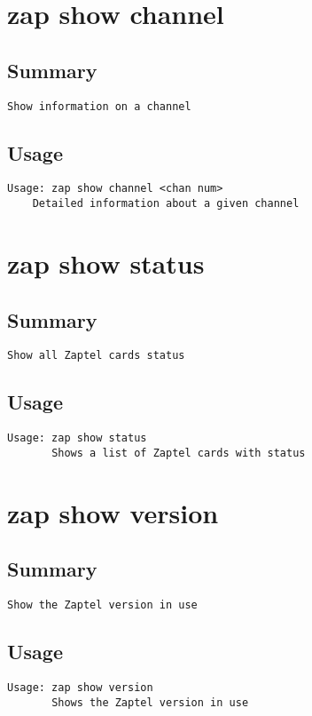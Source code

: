 \section{zap show channel}
\subsection{Summary}
\begin{verbatim}
Show information on a channel
\end{verbatim}
\subsection{Usage}
\begin{verbatim}
Usage: zap show channel <chan num>
	Detailed information about a given channel

\end{verbatim}


\section{zap show status}
\subsection{Summary}
\begin{verbatim}
Show all Zaptel cards status
\end{verbatim}
\subsection{Usage}
\begin{verbatim}
Usage: zap show status
       Shows a list of Zaptel cards with status

\end{verbatim}


\section{zap show version}
\subsection{Summary}
\begin{verbatim}
Show the Zaptel version in use
\end{verbatim}
\subsection{Usage}
\begin{verbatim}
Usage: zap show version
       Shows the Zaptel version in use

\end{verbatim}


